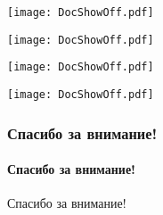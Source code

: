 \documentclass[c]{beamer}  %
\begin{document}
	\begin{frame}[plain]
		\centering
		\hspace*{-0.1\textwidth}%
		\texttt{[image: DocShowOff.pdf]}
	\end{frame}

	\begin{frame}[plain]
		\centering
		\hspace*{-0.1\textwidth}%
		\texttt{[image: DocShowOff.pdf]}
	\end{frame}

	\begin{frame}[plain]
		\centering
		\hspace*{-0.1\textwidth}%
		\texttt{[image: DocShowOff.pdf]}
	\end{frame}

	\begin{frame}[plain]
		\centering
		\hspace*{-0.1\textwidth}%
		\texttt{[image: DocShowOff.pdf]}
	\end{frame}


	\begin{frame}
		\frametitle{Спасибо за внимание!}
		\framesubtitle{Спасибо за внимание!}
		\centering \Huge Спасибо за внимание!		
	\end{frame}
\end{document}
